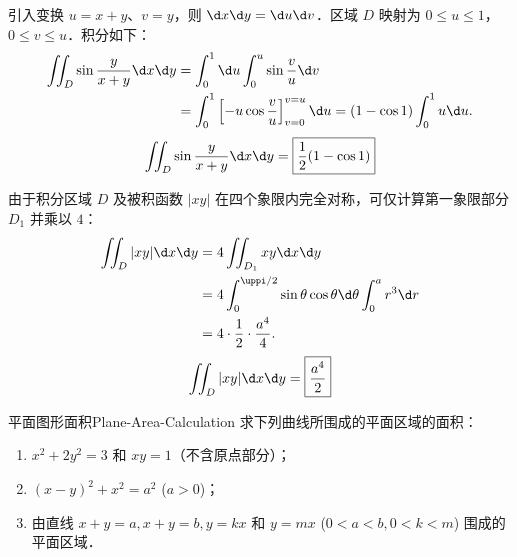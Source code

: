 \begin{solution}

    引入变换 $u = x+y$、$v = y$，则 $\d x \d y = \d u \d v$．区域 $D$ 映射为 $0 \leqslant u \leqslant 1$，$0 \leqslant v \leqslant u$．积分如下：
    \begin{equation}
        \begin{aligned}
            \iint_D \sin \frac{y}{x+y} \d x \d y & = \int_0^1 \d u \int_0^u \sin \frac{v}{u} \d v                                                 \\
                                                 & = \int_0^1 \left[ -u \cos \frac{v}{u} \right]_{v=0}^{v=u} \d u = (1 - \cos 1) \int_0^1 u \d u.
        \end{aligned}
    \end{equation}
    \begin{equation}
        \iint_D \sin \frac{y}{x+y} \d x \d y = \boxed{\frac{1}{2}(1 - \cos 1)}
    \end{equation}


    由于积分区域 $D$ 及被积函数 $|xy|$ 在四个象限内完全对称，可仅计算第一象限部分 $D_1$ 并乘以 $4$：
    \begin{equation}
        \begin{aligned}
            \iint_D |xy| \d x \d y & = 4 \iint_{D_1} xy \d x \d y                                                                   \\
                                   & = 4 \int_0^{\uppi/2} \sin \theta \cos \theta \d \theta \int_0^a r^3 \d r \label{eq:int-9-step} \\
                                   & = 4 \cdot \frac{1}{2} \cdot \frac{a^4}{4}.
        \end{aligned}
    \end{equation}
    \begin{equation}
        \iint_D |xy| \d x \d y = \boxed{\frac{a^4}{2}}
    \end{equation}
\end{solution}


\begin{problem}{平面图形面积}{Plane-Area-Calculation}
    求下列曲线所围成的平面区域的面积：
    \begin{enumerate}
        \item $x^2 + 2y^2 = 3$ 和 $xy = 1$（不含原点部分）；
        \item $(x - y)^2 + x^2 = a^2$ ($a > 0$)；
        \item 由直线 $x + y = a, x + y = b, y = kx$ 和 $y = m x$ ($0 < a < b, 0 < k < m$) 围成的平面区域．
    \end{enumerate}
\end{problem}

